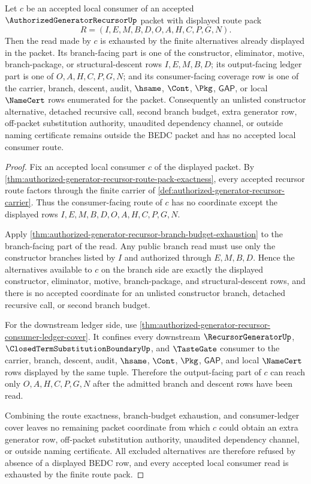 \begin{lemma}
\label{lem:authorized-generator-recursor-route-pack-downstream-coverage}
Let $c$ be an accepted local consumer of an accepted $\AuthorizedGeneratorRecursorUp$ packet with displayed route pack
$$
R=(I,E,M,B,D,O,A,H,C,P,G,N).
$$
Then the read made by $c$ is exhausted by the finite alternatives already displayed in the packet. Its branch-facing part is one of the constructor, eliminator, motive, branch-package, or structural-descent rows $I,E,M,B,D$; its output-facing ledger part is one of $O,A,H,C,P,G,N$; and its consumer-facing coverage row is one of the carrier, branch, descent, audit, $\hsame$, $\Cont$, $\Pkg$, $\mathsf{GAP}$, or local $\NameCert$ rows enumerated for the packet. Consequently an unlisted constructor alternative, detached recursive call, second branch budget, extra generator row, off-packet substitution authority, unaudited dependency channel, or outside naming certificate remains outside the BEDC packet and has no accepted local consumer route.
\end{lemma}
\begin{proof}
Fix an accepted local consumer $c$ of the displayed packet. By \autoref{thm:authorized-generator-recursor-route-pack-exactness}, every accepted recursor route factors through the finite carrier of \autoref{def:authorized-generator-recursor-carrier}. Thus the consumer-facing route of $c$ has no coordinate except the displayed rows $I,E,M,B,D,O,A,H,C,P,G,N$.

Apply \autoref{thm:authorized-generator-recursor-branch-budget-exhaustion} to the branch-facing part of the read. Any public branch read must use only the constructor branches listed by $I$ and authorized through $E,M,B,D$. Hence the alternatives available to $c$ on the branch side are exactly the displayed constructor, eliminator, motive, branch-package, and structural-descent rows, and there is no accepted coordinate for an unlisted constructor branch, detached recursive call, or second branch budget.

For the downstream ledger side, use \autoref{thm:authorized-generator-recursor-consumer-ledger-cover}. It confines every downstream $\RecursorGeneratorUp$, $\ClosedTermSubstitutionBoundaryUp$, and $\TasteGate$ consumer to the carrier, branch, descent, audit, $\hsame$, $\Cont$, $\Pkg$, $\mathsf{GAP}$, and local $\NameCert$ rows displayed by the same tuple. Therefore the output-facing part of $c$ can reach only $O,A,H,C,P,G,N$ after the admitted branch and descent rows have been read.

Combining the route exactness, branch-budget exhaustion, and consumer-ledger cover leaves no remaining packet coordinate from which $c$ could obtain an extra generator row, off-packet substitution authority, unaudited dependency channel, or outside naming certificate. All excluded alternatives are therefore refused by absence of a displayed BEDC row, and every accepted local consumer read is exhausted by the finite route pack.
\end{proof}
